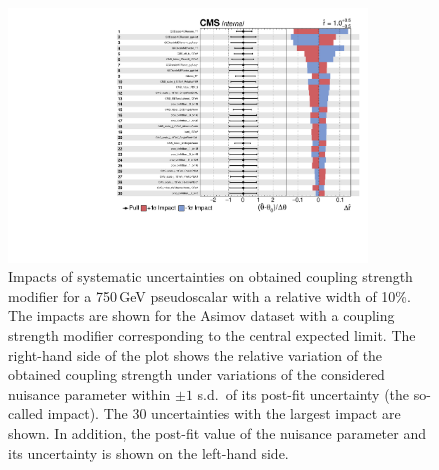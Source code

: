 \begin{figure}[!Hhtb]
\centering
\includegraphics[width=0.85\textwidth,keepaspectratio=true]{fig/app5/impacts/impacts_750.pdf}
\caption{Impacts of systematic uncertainties on obtained coupling strength modifier for a 750\,GeV pseudoscalar with a relative width of 10\%. The impacts are shown for the Asimov dataset with a coupling strength modifier corresponding to the central expected limit. The right-hand side of the plot shows the relative variation of the obtained coupling strength under variations of the considered nuisance parameter within $\pm 1$ s.d.\ of its post-fit uncertainty (the so-called impact). The 30 uncertainties with the largest impact are shown. In addition, the post-fit value of the nuisance parameter and its uncertainty is shown on the left-hand side.}
\label{fig:impacts_m750}
\end{figure}


